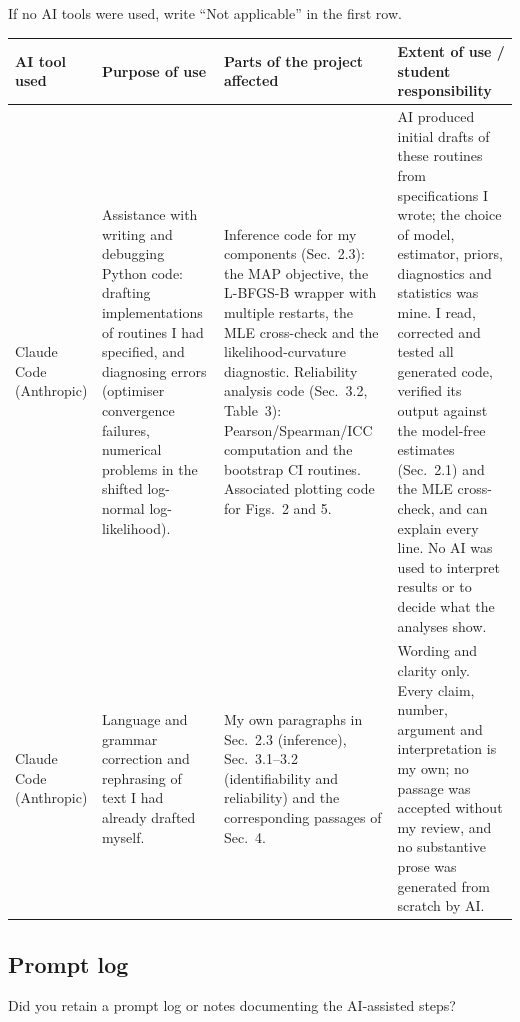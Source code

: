 \documentclass[11pt]{article}
\begin{document}
If no AI tools were used, write ``Not applicable'' in the first row.

\medskip

\begin{tabularx}{\textwidth}{|
>{\raggedright\arraybackslash}X|
>{\raggedright\arraybackslash}X|
>{\raggedright\arraybackslash}X|
>{\raggedright\arraybackslash}X|}
\hline
\textbf{AI tool used} &
\textbf{Purpose of use} &
\textbf{Parts of the project affected} &
\textbf{Extent of use / student responsibility} \\
\hline
Claude Code (Anthropic) &
Assistance with writing and debugging Python code: drafting implementations of
routines I had specified, and diagnosing errors (optimiser convergence failures,
numerical problems in the shifted log-normal log-likelihood). &
Inference code for my components (Sec.~2.3): the MAP objective, the L-BFGS-B
wrapper with multiple restarts, the MLE cross-check and the likelihood-curvature
diagnostic. Reliability analysis code (Sec.~3.2, Table~3): Pearson/Spearman/ICC
computation and the bootstrap CI routines. Associated plotting code for
Figs.~2 and 5. &
AI produced initial drafts of these routines from specifications I wrote; the
choice of model, estimator, priors, diagnostics and statistics was mine.
I read, corrected and tested all generated code, verified its output against
the model-free estimates (Sec.~2.1) and the MLE cross-check, and can explain
every line. No AI was used to interpret results or to decide what the analyses
show. \\
[2.5em]
\hline
Claude Code (Anthropic) &
Language and grammar correction and rephrasing of text I had already drafted
myself. &
My own paragraphs in Sec.~2.3 (inference), Sec.~3.1--3.2 (identifiability and
reliability) and the corresponding passages of Sec.~4. &
Wording and clarity only. Every claim, number, argument and interpretation is my
own; no passage was accepted without my review, and no substantive prose was
generated from scratch by AI. \\
[2.5em]
\hline
\end{tabularx}

\bigskip

\subsection*{Prompt log}

\noindent
Did you retain a prompt log or notes documenting the AI-assisted steps?

\medskip
\end{document}
